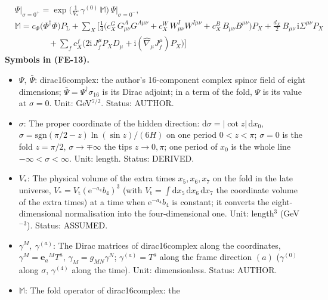 \documentclass[
  10pt,
]{article}
\providecommand{\tightlist}{%
  \setlength{\itemsep}{0pt}\setlength{\parskip}{0pt}}
\begin{document}
\[
\begin{aligned}
&\Psi\big\vert_{\sigma=0^+} = \exp\Big(\frac{1}{V_*}\,\gamma^{(0)}\,\mathbb{M}\Big)\,\Psi\big\vert_{\sigma=0^-},\\
&\mathbb{M} = c_\Phi\big(\Phi^\dagger\Phi\big)P_{\mathrm{L}} + \sum_X\Big[\frac14\big(c^{G}_X\,G^A_{\mu\nu}G^{A\mu\nu}
 + c^{W}_X\,W^I_{\mu\nu}W^{I\mu\nu} + c^{B}_X\,B_{\mu\nu}B^{\mu\nu}\big)P_X + \frac{d_X}{2}\,B_{\mu\nu}\,\mathrm{i}\Sigma^{\mu\nu}P_X\\
&\qquad\qquad + \sum_f c^{f}_X\big(2\mathrm{i}\,J_f^\mu P_XD_\mu + \mathrm{i}(\hat\nabla_\mu J_f^\mu)P_X\big)\Big]
\end{aligned} \tag{FE-13}
\] \textbf{Symbols in (FE-13).}

\begin{itemize}
\tightlist
\item
  \(\Psi,\ \bar\Psi\): dirac16complex: the author's 16-component complex
  spinor field of eight dimensions;
  \(\bar\Psi = \Psi^\dagger\sigma_{16}\) is its Dirac adjoint; in a term
  of the fold, \(\Psi\) is its value at \(\sigma = 0\). Unit:
  GeV\(^{7/2}\). Status: AUTHOR.
\item
  \(\sigma\): The proper coordinate of the hidden direction:
  \(\mathrm{d}\sigma = \lvert\cot z\rvert\,\mathrm{d}x_0\),
  \(\sigma = \mathrm{sgn}(\pi/2 - z)\ln(\sin z)/(6H)\) on one period
  \(0 < z < \pi\); \(\sigma = 0\) is the fold \(z = \pi/2\),
  \(\sigma \to \mp\infty\) the tips \(z \to 0, \pi\); one period of
  \(x_0\) is the whole line \(-\infty < \sigma < \infty\). Unit: length.
  Status: DERIVED.
\item
  \(V_*\): The physical volume of the extra times \(x_5, x_6, x_7\) on
  the fold in the late universe,
  \(V_* = V_{\mathrm{t}}(\mathrm{e}^{-a_4}b_4)^3\) (with
  \(V_{\mathrm{t}} = \int\mathrm{d}x_5\,\mathrm{d}x_6\,\mathrm{d}x_7\)
  the coordinate volume of the extra times) at a time when
  \(\mathrm{e}^{-a_4}b_4\) is constant; it converts the
  eight-dimensional normalisation into the four-dimensional one. Unit:
  length\(^3\) (GeV\(^{-3}\)). Status: ASSUMED.
\item
  \(\gamma^M,\ \gamma^{(a)}\): The Dirac matrices of dirac16complex
  along the coordinates, \(\gamma^M = \mathbf{e}_a{}^MT^a\),
  \(\gamma_M = g_{MN}\gamma^N\); \(\gamma^{(a)} = T^a\) along the frame
  direction \((a)\) (\(\gamma^{(0)}\) along \(\sigma\), \(\gamma^{(4)}\)
  along the time). Unit: dimensionless. Status: AUTHOR.
\item
  \(\mathbb{M}\): The fold operator of dirac16complex: the

\end{itemize}
\end{document}
